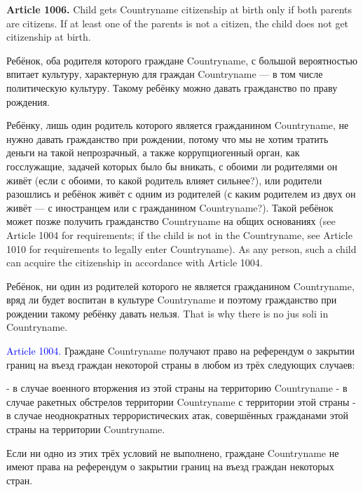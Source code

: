 \documentclass[11pt]{article}
\theoremstyle{remark}
\theoremstyle{definition}
\begin{document}
\color{black}


\textbf{Article 1006.} Child gets Countryname citizenship at birth only if both parents are citizens. If at least one of the parents is not a citizen, the child does not get citizenship at birth. 

\color{blue}

Ребёнок, оба родителя которого граждане Countryname, с большой вероятностью впитает культуру, характерную для граждан Countryname --- в том числе политическую культуру. Такому ребёнку можно давать гражданство по праву рождения. 

Ребёнку, лишь один родитель которого является гражданином Countryname, не нужно давать гражданство при рождении, потому что мы не хотим тратить деньги на такой непрозрачный, а также коррупциогенный орган, как госслужащие, задачей которых было бы вникать, с обоими ли родителями он живёт (если с обоими, то какой родитель влияет сильнее?), или родители разошлись и ребёнок живёт с одним из родителей (с каким родителем из двух он живёт --- с иностранцем или с гражданином Countryname?). Такой ребёнок может позже получить гражданство Countryname на общих основаниях (see Article 1004 for requirements; if the child is not in the Countryname, see Article 1010 for requirements to legally enter Countryname). As any person, such a child can acquire the citizenship in accordance with Article 1004. 

Ребёнок, ни один из родителей которого не является гражданином Countryname, вряд ли будет воспитан в культуре Countryname и поэтому гражданство при рождении такому ребёнку давать нельзя. That is why there is no jus soli in Countryname. 



\color{black}








\textcolor{blue}{Article 1004.} Граждане Countryname получают право на референдум о закрытии границ на въезд граждан некоторой страны в любом из трёх следующих случаев:

- в случае военного вторжения из этой страны на территорию Countryname
- в случае ракетных обстрелов территории Countryname с территории этой страны
- в случае неоднократных террористических атак, совершённых гражданами этой страны на территории Countryname. 

Если ни одно из этих трёх условий не выполнено, граждане Countryname не имеют права на референдум о закрытии границ на въезд граждан некоторых стран. 
\end{document}
